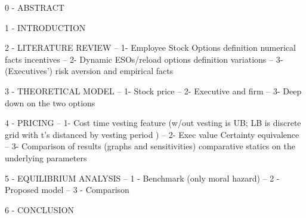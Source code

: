 
0 - ABSTRACT

1 - INTRODUCTION


2 - LITERATURE REVIEW
-- 1- Employee Stock Options
        definition 
        numerical facts
        incentives
-- 2- Dynamic ESOs/reload options
        definition
        variations
-- 3- (Executives') risk aversion and empirical facts


3 - THEORETICAL MODEL
-- 1- Stock price
-- 2- Executive and firm 
-- 3- Deep down on the two options


4 - PRICING
-- 1- Cost
        time vesting feature (w/out vesting is UB; LB is discrete grid with t's distanced by vesting period )
-- 2- Exec value
        Certainty equivalence
-- 3- Comparison of results (graphs and sensitivities)
        comparative statics on the underlying parameters


5 - EQUILIBRIUM ANALYSIS
-- 1 - Benchmark (only moral hazard)
-- 2 - Proposed model 
-- 3 - Comparison 


6 - CONCLUSION